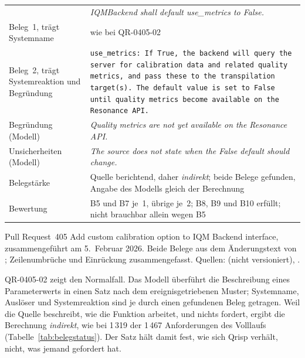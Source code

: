 \documentclass[11pt,a4paper]{report}
\begin{document}
\begin{table}[htbp]
\begin{tabular}{@{}>{\raggedright\arraybackslash}p{2.9cm}%
                    >{\raggedright\arraybackslash}p{10.6cm}@{}}
      & \textit{IQMBackend shall default use\_metrics to False.} \\
    Beleg~1, trägt Systemname
      & wie bei QR-0405-02 \\
    Beleg~2, trägt Systemreaktion und Begründung
      & {\footnotesize\texttt{use\_metrics: If True, the backend will
        query the server for calibration data and related quality
        metrics, and pass these to the transpilation target(s). The
        default value is set to False until quality metrics become
        available on the Resonance API.}} \\
    Begründung (Modell)
      & \textit{Quality metrics are not yet available on the Resonance
        API.} \\
    Unsicherheiten (Modell)
      & \textit{The source does not state when the False default should
        change.} \\
    Belegstärke
      & Quelle berichtend, daher \emph{indirekt}; beide Belege gefunden,
        Angabe des Modells gleich der Berechnung \\
    Bewertung
      & B5 und B7 je~1, übrige je~2; B8, B9 und B10 erfüllt; nicht
        brauchbar allein wegen B5 \\
    \bottomrule
  \end{tabular}

  \vspace{0.5em}
  \footnotesize\raggedright
  Pull Request~405 \glqq Add custom calibration option to IQM Backend
  interface\grqq{}, zusammengeführt am 5.~Februar 2026. Beide Belege aus
  dem Änderungstext von
  ;
  Zeilenumbrüche und Einrückung zusammengefasst. Quellen:
   (nicht
  versioniert), .
\end{table}

QR-0405-02 zeigt den Normalfall. Das Modell überführt die Beschreibung
eines Parameterwerts in einen Satz nach dem ereignisgetriebenen Muster;
Systemname, Auslöser und Systemreaktion sind je durch einen gefundenen
Beleg getragen. Weil die Quelle beschreibt, wie die Funktion arbeitet,
und nichts fordert, ergibt die Berechnung \emph{indirekt}, wie bei
1\,319 der 1\,467 Anforderungen des Volllaufs
(Tabelle~\ref{tab:belegstatus}). Der Satz hält damit fest, wie sich
Qrisp verhält, nicht, was jemand gefordert hat.
\end{document}
